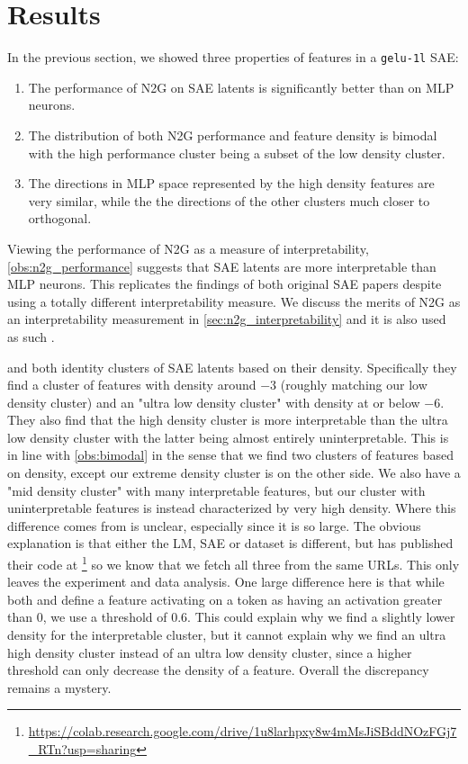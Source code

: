 \section{Results}
In the previous section, we showed three properties of features in a \texttt{gelu-1l} SAE: 
\begin{enumerate}[ref={observation~\arabic*}]
    \item The performance of N2G on SAE latents is significantly better than on MLP neurons.\label{obs:n2g_performance}
    \item The distribution of both N2G performance and feature density is bimodal with the high performance cluster being a subset of the low density cluster.\label{obs:bimodal}
    \item The directions in MLP space represented by the high density features are very similar, while the the directions of the other clusters much closer to orthogonal.\label{obs:directions}
\end{enumerate}
Viewing the performance of N2G as a measure of interpretability, \ref{obs:n2g_performance} suggests that SAE latents are more interpretable than MLP neurons.
This replicates the findings of both original SAE papers \parencite{bricken_towards_2023}\parencite{cunningham_sparse_2023} despite using a totally different interpretability measure.
We discuss the merits of N2G as an interpretability measurement in \autoref{sec:n2g_interpretability} and it is also used as such \textcite{gao_scaling_2024}.

\textcite{bricken_towards_2023} and \textcite{nanda_open_2023} both identity clusters of SAE latents based on their density.
Specifically they find a cluster of features with density around $-3$ (roughly matching our low density cluster) and an "ultra low density cluster" with density at or below $-6$.
They also find that the high density cluster is more interpretable than the ultra low density cluster with the latter being almost entirely uninterpretable.
This is in line with \ref{obs:bimodal} in the sense that we find two clusters of features based on density, except our extreme density cluster is on the other side.
We also have a "mid density cluster" with many interpretable features, but our cluster with uninterpretable features is instead characterized by very high density.
Where this difference comes from is unclear, especially since it is so large.
The obvious explanation is that either the LM, SAE or dataset is different, but \textcite{nanda_open_2023} has published their code at \footnote{\url{https://colab.research.google.com/drive/1u8larhpxy8w4mMsJiSBddNOzFGj7_RTn?usp=sharing}} so we know that we fetch all three from the same URLs.
This only leaves the experiment and data analysis.
One large difference here is that while both \textcite{bricken_towards_2023} and \textcite{nanda_open_2023} define a feature activating on a token as having an activation greater than $0$, we use a threshold of $0.6$.
This could explain why we find a slightly lower density for the interpretable cluster, but it cannot explain why we find an ultra high density cluster instead of an ultra low density cluster, since a higher threshold can only decrease the density of a feature.
Overall the discrepancy remains a mystery.

